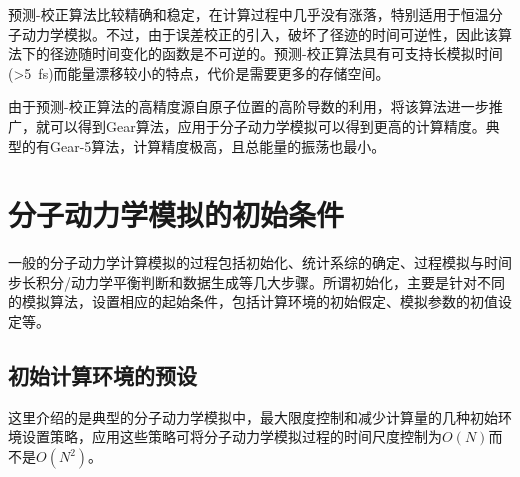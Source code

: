 预测-校正算法比较精确和稳定，在计算过程中几乎没有涨落，特别适用于恒温分子动力学模拟。不过，由于误差校正的引入，破坏了径迹的时间可逆性，因此该算法下的径迹随时间变化的函数是不可逆的。预测-校正算法具有可支持长模拟时间(>5~\textrm{fs})而能量漂移较小的特点，代价是需要更多的存储空间。

由于预测-校正算法的高精度源自原子位置的高阶导数的利用，将该算法进一步推广，就可以得到\textrm{Gear}算法\cite{ODE_1971}，应用于分子动力学模拟可以得到更高的计算精度。典型的有\textrm{Gear}-5算法，计算精度极高，且总能量的振荡也最小。%

\section{分子动力学模拟的初始条件}
一般的分子动力学计算模拟的过程包括初始化、统计系综的确定、过程模拟与时间步长积分/动力学平衡判断和数据生成等几大步骤。所谓初始化，主要是针对不同的模拟算法，设置相应的起始条件，包括计算环境的初始假定、模拟参数的初值设定等。%
\subsection{初始计算环境的预设}
这里介绍的是典型的分子动力学模拟中，最大限度控制和减少计算量的几种初始环境设置策略，应用这些策略可将分子动力学模拟过程的时间尺度控制为$O(N)$而不是$O(N^2)$。
